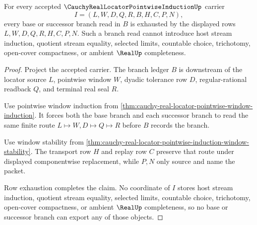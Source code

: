 \begin{theorem}
\label{thm:cauchy-real-locator-pointwise-branch-exhaustion}
For every accepted $\CauchyRealLocatorPointwiseInductionUp$ carrier
$$
I=(L,W,D,Q,R,B,H,C,P,N),
$$
every base or successor branch read in $B$ is exhausted by the displayed rows $L,W,D,Q,R,H,C,P,N$. Such a branch read cannot introduce host stream induction, quotient stream equality, selected limits, countable choice, trichotomy, open-cover compactness, or ambient $\RealUp$ completeness.
\end{theorem}
\begin{proof}
Project the accepted carrier. The branch ledger $B$ is downstream of the locator source $L$, pointwise window $W$, dyadic tolerance row $D$, regular-rational readback $Q$, and terminal real seal $R$.

Use pointwise window induction from \autoref{thm:cauchy-real-locator-pointwise-window-induction}. It forces both the base branch and each successor branch to read the same finite route $L \longmapsto W,D \longmapsto Q \longmapsto R$ before $B$ records the branch.

Use window stability from \autoref{thm:cauchy-real-locator-pointwise-induction-window-stability}. The transport row $H$ and replay row $C$ preserve that route under displayed componentwise replacement, while $P,N$ only source and name the packet.

Row exhaustion completes the claim. No coordinate of $I$ stores host stream induction, quotient stream equality, selected limits, countable choice, trichotomy, open-cover compactness, or ambient $\RealUp$ completeness, so no base or successor branch can export any of those objects.
\end{proof}

